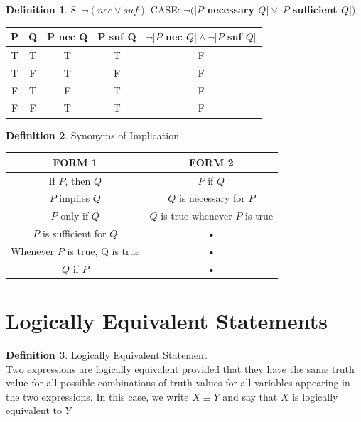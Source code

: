 \documentclass{book}
\theoremstyle{definition}
\newtheorem{definition}{Definition}[section]
\theoremstyle{remark}
\begin{document}
\begin{definition}
8. $\neg(nec \vee suf)$ CASE: {\bf $\neg([P$ necessary $Q] \vee [P$ sufficient $Q])$} \\
\begin{center}
\begin{tabular}{|c|c|c|c|c|}
\hline 
P & Q & P nec Q & P suf Q & $\neg[P$ nec $Q] \wedge \neg[P$ suf $Q]$  \\ 
\hline 
T & T & T & T & F\\ 
\hline 
T & F & T & F & F\\ 
\hline 
F & T & F & T & F\\ 
\hline 
F & F & T & T & F\\ 
\hline 
\end{tabular} 
\end{center} 
\end{definition}

\begin{definition}
Synonyms of Implication

\begin{center}
\begin{tabular}{|c|c|}
\hline 
FORM 1 & FORM 2 \\ 
\hline 
If $P$, then $Q$ & $P$ if $Q$ \\ 
\hline 
$P$ implies $Q$ & $Q$ is necessary for $P$ \\ 
\hline 
$P$ only if $Q$ & $Q$ is true whenever $P$ is true \\ 
\hline 
$P$ is sufficient for $Q$ & • \\ 
\hline 
Whenever $P$ is true, Q is true & • \\ 
\hline 
$Q$ if $P$ & • \\ 
\hline 
\end{tabular} 
\end{center}
\end{definition}



\newpage
\section{Logically Equivalent Statements}
\begin{definition}
Logically Equivalent Statement \\

Two expressions are logically equivalent provided that they have the same truth value for all possible combinations of truth values for all variables appearing in the two expressions. In this case, we write $X \equiv Y$ and say that $X$ is logically equivalent to $Y$ \\
\end{definition}
\end{document}

